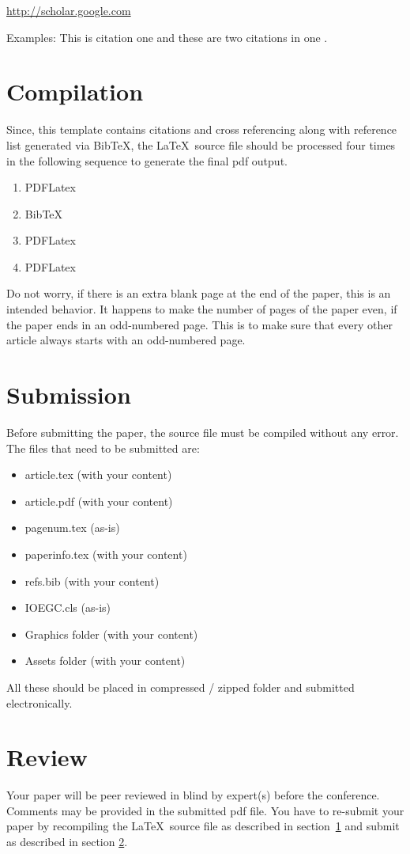 \documentclass[fleqn, 10pt, twoside, blindreview]{IOEGC}
\begin{document}
\url{http://scholar.google.com}

Examples: This is citation one\cite{lamport1994} and these are two citations in 
one \cite{oetiker2001not, kopka1995guide}.


\section{Compilation} \label{sec:compile}
Since, this template contains citations and cross referencing along with 
reference list generated via BibTeX, the \LaTeX\ source file should be processed
four times in the following sequence to generate the final pdf output.
\begin{enumerate}
	\item PDFLatex
	\item BibTeX
	\item PDFLatex
	\item PDFLatex
\end{enumerate}

Do not worry, if there is an extra blank page at the end of the paper, this is 
an intended behavior. It happens to make the number of pages of the paper even, 
if the paper ends in an odd-numbered page. This is to make sure that every other
article always starts with an odd-numbered page.


\section{Submission} \label{sec:submit}
Before submitting the paper, the source file must be compiled without any error. 
The files that need to be submitted are:
\begin{itemize}[noitemsep]
\item article.tex (with your content)
\item article.pdf (with your content)
\item pagenum.tex (as-is)
\item paperinfo.tex (with your content)
\item refs.bib (with your content)
\item IOEGC.cls (as-is)
\item Graphics folder  (with your content)
\item Assets folder (with your content)
\end{itemize}
All these should be placed in compressed / zipped folder and submitted 
electronically.

\section{Review}
Your paper will be peer reviewed in blind by expert(s) before the conference. 
Comments may be provided in the submitted pdf file. You have to re-submit your 
paper by recompiling the \LaTeX\ source file as described in 
section~\ref{sec:compile} and submit as described in section \ref{sec:submit}.
\end{document}

